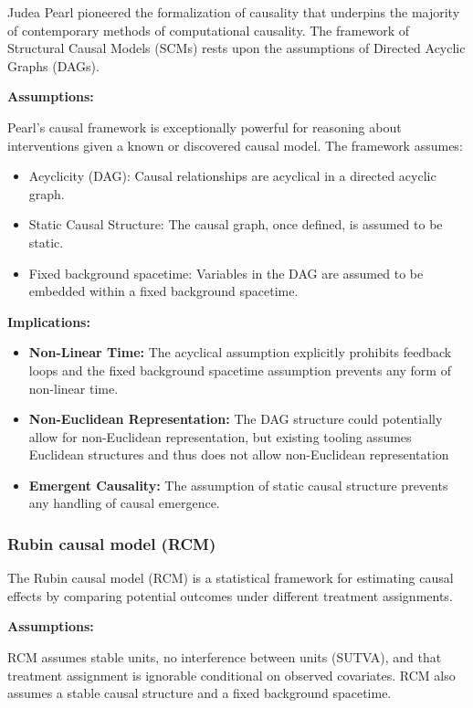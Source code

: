 \documentclass{article}
\begin{document}
Judea Pearl pioneered the formalization of causality that underpins the majority of contemporary methods of computational causality. The framework of Structural Causal Models\cite{pearl2000causality} (SCMs) rests upon the assumptions of Directed Acyclic Graphs (DAGs).

\textbf{Assumptions:}

Pearl's causal framework is exceptionally powerful for reasoning about interventions given a known or discovered causal model.
The framework assumes: 

\begin{itemize}
    \item Acyclicity (DAG): Causal relationships are acyclical in a directed acyclic graph.
    \item Static Causal Structure: The causal graph, once defined, is assumed to be static.
    \item Fixed background spacetime: Variables in the DAG are assumed to be embedded within a fixed background spacetime.
\end{itemize}


\textbf{Implications:}

\begin{itemize}
    \item \textbf{Non-Linear Time:} The acyclical assumption explicitly prohibits feedback loops and the fixed background spacetime assumption prevents any form of non-linear time.
    \item \textbf{Non-Euclidean Representation:} The DAG structure could potentially allow for non-Euclidean representation, but existing tooling assumes Euclidean structures and thus does not allow non-Euclidean representation
    \item \textbf{Emergent Causality:} The assumption of static causal structure prevents any handling of causal emergence.
\end{itemize}

\newpage

\subsubsection{Rubin causal model (RCM)}

The Rubin causal model\cite{rubin2005causal} (RCM) is a statistical framework for estimating causal effects by comparing potential outcomes under different treatment assignments.

\textbf{Assumptions:}

RCM assumes stable units, no interference between units (SUTVA), and that treatment assignment is ignorable conditional on observed covariates. RCM also assumes a stable causal structure and a fixed background spacetime.
\end{document}
